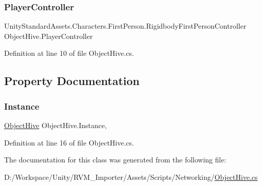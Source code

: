\subsubsection{\texorpdfstring{PlayerController}{PlayerController}}
{\footnotesize\ttfamily Unity\+Standard\+Assets.\+Characters.\+First\+Person.\+Rigidbody\+First\+Person\+Controller Object\+Hive.\+Player\+Controller}



Definition at line 10 of file Object\+Hive.\+cs.



\subsection{Property Documentation}
\mbox{\label{class_object_hive_a1e74114f0e3a5a7e6bbd998ade53eb53}} 
\subsubsection{\texorpdfstring{Instance}{Instance}}
{\footnotesize\ttfamily \mbox{\hyperlink{class_object_hive}{Object\+Hive}} Object\+Hive.\+Instance\hspace{0.3cm}{\ttfamily [static]}, {\ttfamily [get]}}



Definition at line 16 of file Object\+Hive.\+cs.



The documentation for this class was generated from the following file\+:\begin{DoxyCompactItemize}
\item 
D\+:/\+Workspace/\+Unity/\+R\+V\+M\+\_\+\+Importer/\+Assets/\+Scripts/\+Networking/\mbox{\hyperlink{_object_hive_8cs}{Object\+Hive.\+cs}}\end{DoxyCompactItemize}
